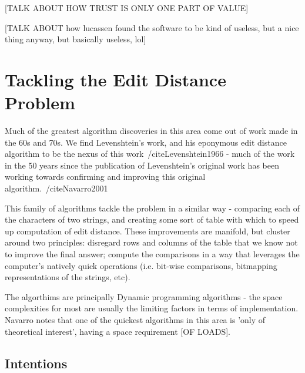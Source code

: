 \documentclass[a4paper,11pt,twoside,notitlepage]{report}
\begin{document}
        [TALK ABOUT HOW TRUST IS ONLY ONE PART OF VALUE]

        [TALK ABOUT how lucassen found the software to be kind of
          useless, but a nice thing anyway, but basically useless, lol]
 
	\section{Tackling the Edit Distance Problem}
        Much of the greatest algorithm discoveries in this area come
        out of work made in the 60s and 70s. We find Levenshtein's
        work, and his eponymous edit distance algorithm to be the nexus of
        this work~/cite{Levenshtein1966} - much of the work in the 50 years since the
        publication of Levenshtein's original work has been working
        towards confirming and improving this original algorithm.~/cite{Navarro2001}

        This family of algorithms tackle the problem in a similar way
        - comparing each of the characters of two strings, and
        creating some sort of table with which to speed up computation
        of edit distance. These improvements are manifold, but
        cluster around two principles: disregard rows and columns of
        the table that we know not to improve the final answer;
        compute the comparisons in a way that leverages the computer's
        natively quick operations (i.e. bit-wise comparisons,
        bitmapping representations of the strings, etc).

        The algorthims are principally Dynamic programming algorithms
        - the space complexities for most are usually the limiting
        factors in terms of implementation. Navarro notes that one of
        the quickest algorithms in this area is 'only of theoretical
        interest', having a space requirement [OF LOADS].

        \subsection{Intentions}

{}
	
\end{document}
